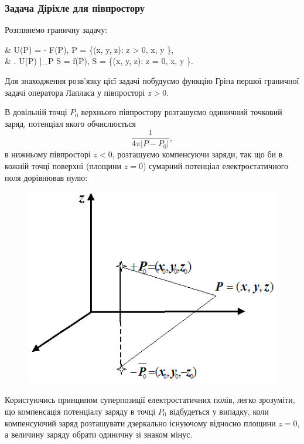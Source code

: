 \subsubsection{Задача Діріхле для півпростору}

Розглянемо граничну задачу:
\begin{system}
	& \Delta U(P) = - F(P), \quad P \in \Omega = \{(x, y, z): z > 0, x, y \in \RR\}, \\
	& \left. U(P) \right|_{P \in S} = f(P), \quad S = \{(x, y, z): z = 0, x, y \in \RR\}.
\end{system}

Для знаходження розв'язку цієї задачі побудуємо функцію Гріна першої граничної задачі оператора Лапласа у півпросторі $z > 0$. \medskip

В довільній точці $P_0$ верхнього півпростору розташуємо одиничний точковий заряд, потенціал якого обчислюється
\begin{equation}
	\frac{1}{4 \pi |P - P_0|},
\end{equation}
в нижньому півпросторі $z < 0$, розташуємо компенсуючи заряди, так що би в кожній точці поверхні (площини $z = 0$) сумарний потенціал електростатичного поля дорівнював нулю:
\begin{figure}[H]
	\centering
	\includegraphics[]{../img/20-1.png}
\end{figure}

Користуючись принципом суперпозиції електростатичних полів, легко зрозуміти, що компенсація потенціалу заряду в точці $P_0$ відбудеться у випадку, коли компенсуючий заряд розташувати дзеркально існуючому відносно площини $z = 0$, а величину заряду обрати одиничну зі знаком мінус. \medskip

